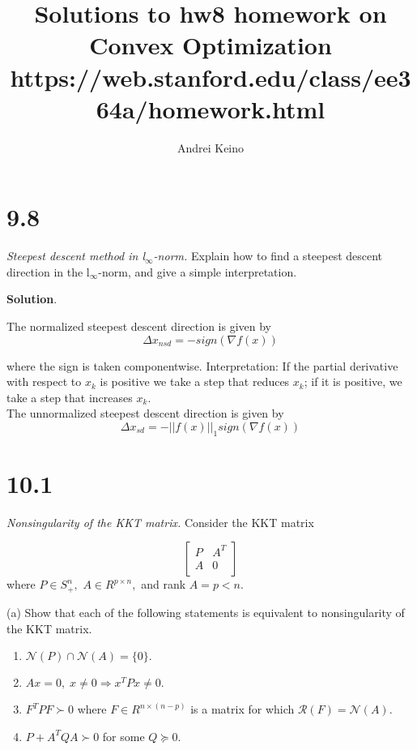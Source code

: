 \documentclass{article}
\begin{document}
\title{Solutions to hw8 homework on Convex Optimization https://web.stanford.edu/class/ee364a/homework.html}
\author{Andrei Keino}
\maketitle

\section*{9.8}

\textit{Steepest descent method in l$_{\infty}$-norm.} Explain how to find a steepest descent direction
in the l$_{\infty}$-norm, and give a simple interpretation.

\textbf{Solution}. 

The normalized steepest descent direction is given by
$$
\Delta x_{nsd} = - sign(\nabla f(x))
$$

where the sign is taken componentwise. Interpretation: If the partial derivative with
respect to $x_k$ is positive we take a step that reduces $x_k$; if it is positive, we take a step
that increases $x_k.$ \\
The unnormalized steepest descent direction is given by
$$
\Delta x_{sd} = - ||f(x)||_1 sign(\nabla f(x))
$$


\section*{10.1}

\textit{Nonsingularity of the KKT matrix.} Consider the KKT matrix

$$
\begin{bmatrix} 
	P & A^T \\
	A & 0\\
\end{bmatrix}
$$
where $P \in S^n_+,$ $A \in R^{p \times n},$ and rank 
$A = p < n.$

(a) Show that each of the following statements is equivalent to nonsingularity of the
KKT matrix.

\begin{enumerate}
	\item $\mathcal{N}(P) \cap \mathcal{N}(A) = \{0\}. $ 
	\item $Ax = 0, \; x \ne 0 \Rightarrow x^T P x \ne 0. $ 
	\item $F^T P F \succ 0$ where 
	$F \in R^{n \times (n - p)}$ is a matrix for which
	$\mathcal{R}(F) = \mathcal{N}(A).$
	\item $P + A^T Q A \succ 0$ for some $Q \succeq 0.$
\end{enumerate}
\end{document}
